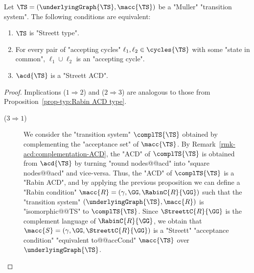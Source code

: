 \documentclass[10pt,a4paper]{amsart}
\renewcommand{\gg}{\gamma}
\begin{document}
\begin{proposition}\label{prop-typ:Streett ACD type}
	Let $\TS = (\underlyingGraph{\TS}, \macc{\TS})$ be a "Muller" "transition system". The following conditions are equivalent:
	\begin{enumerate}
		\item $\TS$ is "Streett type".
		\item For every pair of "accepting cycles" $\ell_1, \ell_2\in \cycles{\TS}$  with some "state in common", $\ell_1\cup \ell_2$ is an "accepting cycle".\footnotemark{}
		\item $\acd{\TS}$ is a "Streett ACD". 
	\end{enumerate}
\end{proposition}
\begin{proof}
	Implications ($1 \Rightarrow 2$) and ($2 \Rightarrow 3$) are analogous to those from Proposition~\ref{prop-typ:Rabin ACD type}.
	\begin{description}		
		\item[($3 \Rightarrow 1$)] We consider the "transition system" $\complTS{\TS}$ obtained by complementing the "acceptance set" of $\macc{\TS}$. By Remark~\ref{rmk-acd:complementation-ACD}, the "ACD" of $\complTS{\TS}$ is obtained from $\acd{\TS}$ by turning "round nodes@@acd" into "square nodes@@acd" and vice-versa. Thus, the "ACD" of $\complTS{\TS}$ is a "Rabin ACD", and by applying the previous proposition we can define a "Rabin condition" $\macc{R} = (\gg, \GG, \RabinC{R}{\GG})$ such that the  "transition system" $(\underlyingGraph{\TS}, \macc{R})$ is "isomorphic@@TS" to $\complTS{\TS}$. Since $\StreettC{R}{\GG}$  is the complement language of $\RabinC{R}{\GG}$, we obtain that $\macc{S} = (\gg, \GG, \StreettC{R}{\GG})$ is a "Streett" "acceptance condition" "equivalent to@@accCond" $\macc{\TS}$ over $\underlyingGraph{\TS}$.\qedhere
	\end{description}
\end{proof} 
\end{document}
